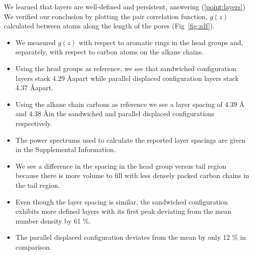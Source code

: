 \documentclass{article}
\newcommand{\angstrom}{\textup{\AA}}
\begin{document}
  We learned that layers are well-defined and persistent, answering (\ref{point:layers})
  We verified our conclusion by
  plotting the pair correlation function, $g(z)$ calculated between atoms along
  the length of the pores (Fig~\ref{fig:zdf}).
  \begin{itemize}
	\item We measured $g(z)$ with respect to aromatic rings in the head groups
	and, separately, with respect to carbon atoms on the alkane chains.
        \item Using the head groups as reference, we see that sandwiched configuration
	layers stack 4.29 \angstrom apart while parallel displaced configuration layers
	stack 4.37 \angstrom apart.
	\item Using the alkane chain carbons as reference we see a layer spacing of 4.39 \angstrom
	and 4.38 \angstrom in the sandwiched and parallel displaced configurations respectively.
        \item The power spectrums used to calculate the reported layer spacings are given in the 
        Supplemental Information.  %
	\item We see a difference in the spacing in the head group versus tail region
	because there is more volume to fill with less densely packed carbon chains in the tail region. 
	\item Even though the layer spacing is similar, the sandwiched configuration
	exhibits more defined layers with its first peak deviating from the mean 
        number density by 61 \%. %
	\item The parallel displaced configuration deviates from the mean by only 
	12 \% in comparison.
  \end{itemize}
\end{document}
